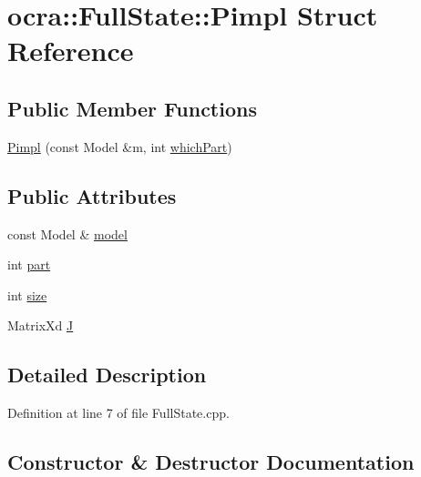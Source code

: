 \hypertarget{structocra_1_1FullState_1_1Pimpl}{}\section{ocra\+:\+:Full\+State\+:\+:Pimpl Struct Reference}
\label{structocra_1_1FullState_1_1Pimpl}
\subsection*{Public Member Functions}
\begin{DoxyCompactItemize}
\item 
\hyperlink{structocra_1_1FullState_1_1Pimpl_a0bede192675a41ae72485eacefca15ac}{Pimpl} (const Model \&m, int \hyperlink{classocra_1_1FullState_a75ec7c039df8cb8608ebf34f7b779be5}{which\+Part})
\end{DoxyCompactItemize}
\subsection*{Public Attributes}
\begin{DoxyCompactItemize}
\item 
const Model \& \hyperlink{structocra_1_1FullState_1_1Pimpl_ac8e2409d7e4a099fdb6fc3ef9c7d3026}{model}
\item 
int \hyperlink{structocra_1_1FullState_1_1Pimpl_ab10f6e199d008d84731024cb80772a5d}{part}
\item 
int \hyperlink{structocra_1_1FullState_1_1Pimpl_a5deca911251aa5b774b3cf7f3f6bd5d4}{size}
\item 
Matrix\+Xd \hyperlink{structocra_1_1FullState_1_1Pimpl_a150f47fa013614729e1e6aedf141523f}{J}
\end{DoxyCompactItemize}


\subsection{Detailed Description}


Definition at line 7 of file Full\+State.\+cpp.



\subsection{Constructor \& Destructor Documentation}
\hypertarget{structocra_1_1FullState_1_1Pimpl_a0bede192675a41ae72485eacefca15ac}{}\label{structocra_1_1FullState_1_1Pimpl_a0bede192675a41ae72485eacefca15ac} 
